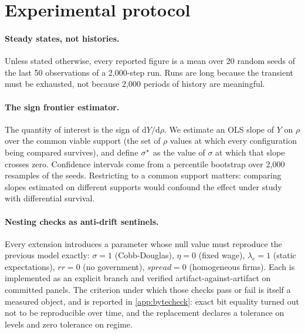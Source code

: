 
\section{Experimental protocol}
\label{sec:method}

\paragraph{Steady states, not histories.}
Unless stated otherwise, every reported figure is a mean over 20 random seeds
of the last 50 observations of a 2{,}000-step run. Runs are long because the
transient must be exhausted, not because 2{,}000 periods of history are
meaningful.

\paragraph{The sign frontier estimator.}
The quantity of interest is the sign of $\mathrm{d}Y/\mathrm{d}\rho$. We
estimate an OLS slope of $Y$ on $\rho$ over the common viable support
(the set of $\rho$ values at which every configuration being compared
survives), and define $\sigma^{\ast}$ as the value of $\sigma$ at which that slope
crosses zero. Confidence intervals come from a percentile bootstrap over
2{,}000 resamples of the seeds. Restricting to a common support matters:
comparing slopes estimated on different supports would confound the effect
under study with differential survival.

\paragraph{Nesting checks as anti-drift sentinels.}
Every extension introduces a parameter whose null value must reproduce the
previous model exactly: $\sigma = 1$ (Cobb-Douglas), $\eta = 0$ (fixed wage),
$\lambda_e = 1$ (static expectations), $rr = 0$ (no government),
$\mathit{spread} = 0$ (homogeneous firms). Each is implemented as an explicit
branch and verified artifact-against-artifact on committed panels. The
criterion under which those checks pass or fail is itself a measured object,
and is reported in \cref{app:bytecheck}: exact bit equality turned out not to
be reproducible over time, and the replacement declares a tolerance on levels
and zero tolerance on regime.

